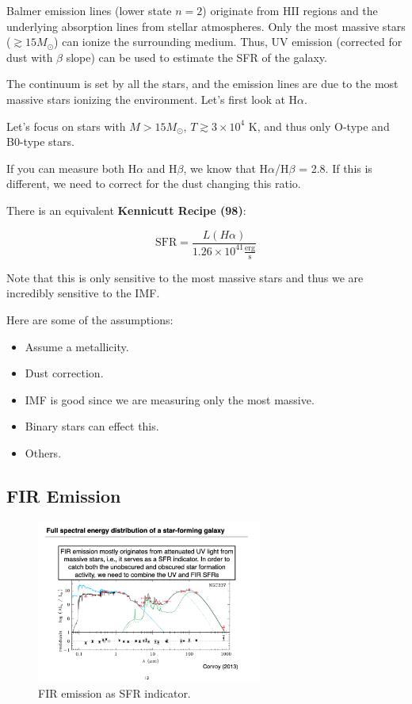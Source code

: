 \documentclass{article}
\def\msun{M_\odot}
\begin{document}
Balmer emission lines (lower state $n=2$) originate from HII regions and the underlying absorption lines from stellar atmospheres. Only the most massive stars ($\gtrsim 15 \msun$) can ionize the surrounding medium. Thus, UV emission (corrected for dust with $\beta$ slope) can be used to estimate the SFR of the galaxy. 

The continuum is set by all the stars, and the emission lines are due to the most massive stars ionizing the environment. Let's first look at H$\alpha$.

Let's focus on stars with $M>15 M_\odot$, $T \gtrsim 3\times 10^4$ K, and thus only O-type and B0-type stars. 

If you can measure both H$\alpha$ and H$\beta$, we know that H$\alpha$/H$\beta$ = 2.8. If this is different, we need to correct for the dust changing this ratio.

There is an equivalent \textbf{Kennicutt Recipe (98)}:

\begin{equation}
    \text{SFR} = \frac{L(H\alpha)}{1.26\times 10^{41} \frac{\text{erg}}{\text{s}}}
\end{equation}

Note that this is only sensitive to the most massive stars and thus we are incredibly sensitive to the IMF. 

Here are some of the assumptions:

\begin{itemize}
    \item Assume a metallicity.
    \item Dust correction.
    \item IMF is good since we are measuring only the most massive. 
    \item Binary stars can effect this.
    \item Others.
\end{itemize}

\subsection{FIR Emission}

\begin{figure}
    \centering
    \includegraphics[width=0.66\textwidth]{figs/Screen Shot 2021-09-24 at 3.38.29 PM.png}
    \caption{FIR emission as SFR indicator.}
    \label{fig:fir_sfr}
\end{figure}
\end{document}

